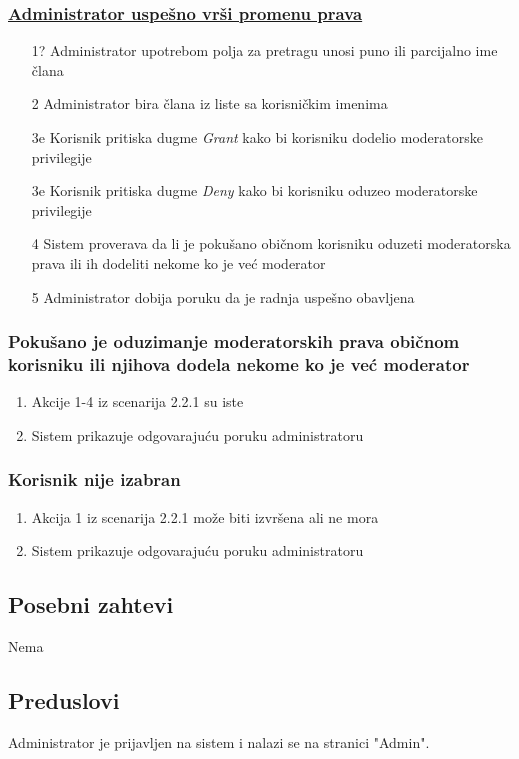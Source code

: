 \documentclass[11pt,a4paper]{article}
\begin{document}
\subsubsection{\underline{Administrator uspešno vrši promenu prava}}
\begin{enumerate}
	\item[1?] Administrator upotrebom polja za pretragu unosi puno ili parcijalno ime člana
    \item[2 ] Administrator bira člana iz liste sa korisničkim imenima
    \item[3e] Korisnik pritiska dugme \textit{Grant} kako bi korisniku dodelio moderatorske privilegije
    \item[3e] Korisnik pritiska dugme \textit{Deny} kako bi korisniku oduzeo moderatorske privilegije
    \item[4 ] Sistem proverava da li je pokušano običnom korisniku oduzeti moderatorska prava ili ih dodeliti nekome ko je već moderator
    \item[5 ] Administrator dobija poruku da je radnja uspešno obavljena
\end{enumerate}

\subsubsection{Pokušano je oduzimanje moderatorskih prava običnom korisniku ili njihova dodela nekome ko je već moderator}
\begin{enumerate}
    \item Akcije 1-4 iz scenarija 2.2.1 su iste
    \item Sistem prikazuje odgovarajuću poruku administratoru
\end{enumerate}

\subsubsection{Korisnik nije izabran}
\begin{enumerate}
    \item Akcija 1 iz scenarija 2.2.1 može biti izvršena ali ne mora
    \item Sistem prikazuje odgovarajuću poruku administratoru
\end{enumerate}

\subsection{Posebni zahtevi}
Nema
\subsection{Preduslovi}
Administrator je prijavljen na sistem i nalazi se na stranici "Admin".
\end{document}
